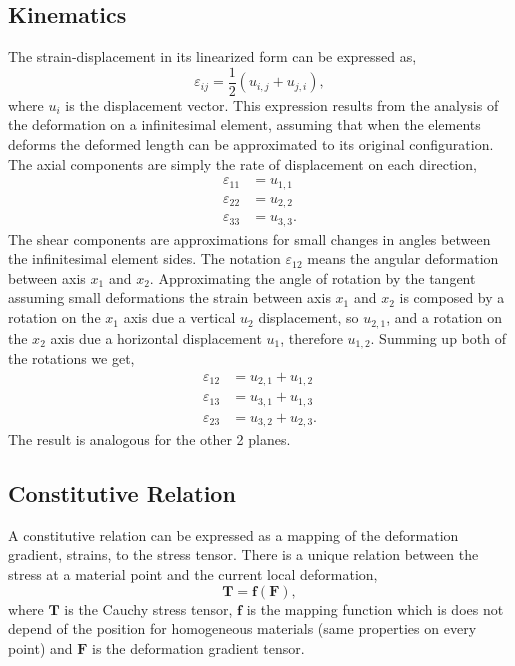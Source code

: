 \documentclass[11pt, a4paper]{article}
\numberwithin{equation}{section}
\begin{document}
\subsection{Kinematics}
The strain-displacement in its linearized form can be expressed as,
\begin{equation}
\varepsilon_{ij} = \dfrac{1}{2} (u_{i,j} + u_{j,i}),
\end{equation}
where $u_{i}$ is the displacement vector. This expression results from the analysis of the deformation on a infinitesimal element, assuming that when the elements deforms the deformed length can be approximated to its original configuration. The axial components are simply the rate of displacement on each direction,
\begin{align*}
\varepsilon_{11} &= u_{1,1}\\
\varepsilon_{22} &= u_{2,2}\\
\varepsilon_{33} &= u_{3,3}.
\end{align*}
The shear components are approximations for small changes in angles between the infinitesimal element sides. The notation $\varepsilon_{12}$ means the angular deformation between axis $x_1$ and $x_2$. Approximating the angle of rotation by the tangent assuming small deformations the strain between axis $x_1$ and $x_2$ is composed by a rotation on the $x_1$ axis due a vertical $u_2$ displacement, so $u_{2,1}$, and a rotation on the $x_2$ axis due a horizontal displacement $u_1$, therefore $u_{1, 2}$. Summing up both of the rotations we get,
\begin{align*}
\varepsilon_{12} &= u_{2,1} + u_{1,2} \\
\varepsilon_{13} &= u_{3,1} + u_{1,3} \\
\varepsilon_{23} &= u_{3,2} + u_{2,3}.
\end{align*}
The result is analogous for the other 2 planes.

\subsection{Constitutive Relation}
A constitutive relation can be expressed as a mapping of the deformation gradient, strains, to the stress tensor. There is a unique relation between the stress at a material point and the current local deformation,
\begin{equation}
\boldsymbol T =\boldsymbol  f(\boldsymbol F),
\end{equation}
where $\boldsymbol T$ is the Cauchy stress tensor, $\boldsymbol f$ is the mapping function which is does not depend of the position for homogeneous materials (same properties on every point) and $\boldsymbol F$ is the deformation gradient tensor.
\end{document}
